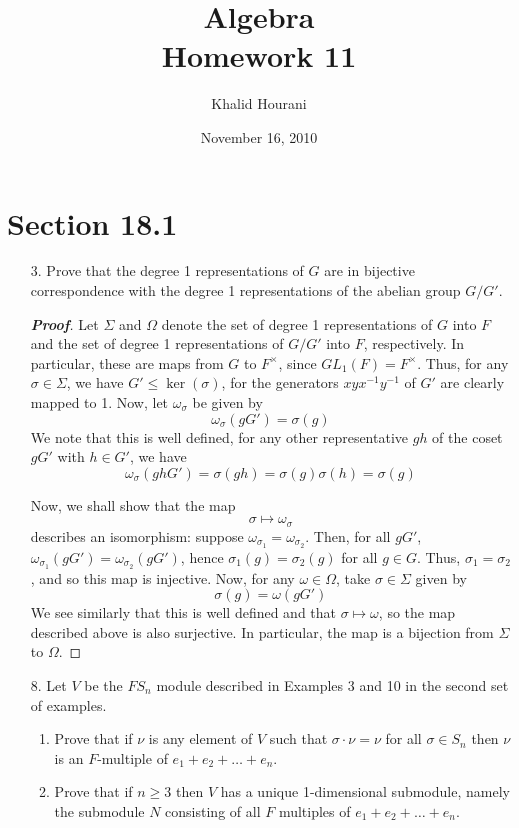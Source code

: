 \documentclass[12pt,leqno]{book}
\title{Algebra\\\large Homework 11}
\date{November 16, 2010}
\author{Khalid Hourani}
\theoremstyle{definition}
\newenvironment{Proof}{\begin{proof}[\textnormal{\textbf{Proof}}]}{\end{proof}}
\begin{document}
\begin{titlepage}
 \maketitle\thispagestyle{empty}
\end{titlepage}
\thispagestyle{empty}
\clearpage\mbox{}\clearpage

\setcounter{page}{1}
\section*{Section 18.1}
\begin{enumerate}
 \item [3.] Prove that the degree 1 representations of $G$ are in bijective correspondence with the degree 1 representations of the abelian group $G/G'$.

\begin{Proof}
 Let $\Sigma$ and $\Omega$ denote the set of degree 1 representations of $G$ into $F$ and the set of degree 1 representations of $G/G'$ into $F$, respectively. In particular, these are maps from $G$ to $F^{\times}$, since $GL_1(F)=F^{\times}$. Thus, for any $\sigma\in\Sigma$, we have $G'\leq\ker(\sigma)$, for the generators $xyx^{-1}y^{-1}$ of $G'$ are clearly mapped to 1. Now, let $\omega_{\sigma}$ be given by \[\omega_{\sigma}(gG')=\sigma(g)\] We note that this is well defined, for any other representative $gh$ of the coset $gG'$ with $h\in G'$, we have \[\omega_{\sigma}(ghG')=\sigma(gh)=\sigma(g)\sigma(h)=\sigma(g)\] 

Now, we shall show that the map \[\sigma\mapsto\omega_{\sigma}\] describes an isomorphism: suppose $\omega_{\sigma_1}=\omega_{\sigma_2}$. Then, for all $gG'$, $\omega_{\sigma_1}(gG')=\omega_{\sigma_2}(gG')$, hence $\sigma_1(g)=\sigma_2(g)$ for all $g\in G$. Thus, $\sigma_1=\sigma_2$, and so this map is injective. Now, for any $\omega\in\Omega$, take $\sigma\in\Sigma$ given by \[\sigma(g)=\omega(gG')\] We see similarly that this is well defined and that $\sigma\mapsto\omega$, so the map described above is also surjective. In particular, the map is a bijection from $\Sigma$ to $\Omega$.
\end{Proof}

 \item [8.] Let $V$ be the $FS_n$ module described in Examples 3 and 10 in the second set of examples.
  \begin{enumerate}
   \item Prove that if $\nu$ is any element of $V$ such that $\sigma\cdot\nu=\nu$ for all $\sigma\in S_n$ then $\nu$ is an $F$-multiple of $e_1+e_2+\hdots+e_n$.
   \item Prove that if $n\geq3$ then $V$ has a unique 1-dimensional submodule, namely the submodule $N$ consisting of all $F$ multiples of $e_1+e_2+\hdots+e_n$.
  \end{enumerate}

\end{enumerate}
\end{document}
